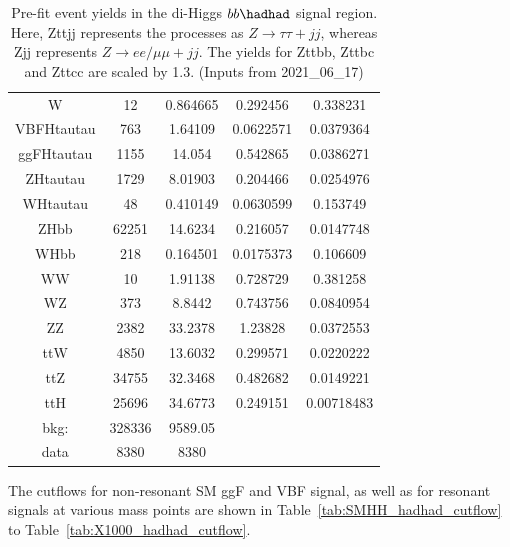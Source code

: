 \begin{table}[]
\begin{tabular}{|c|c|c|c|c|}
W               & 12            & 0.864665      & 0.292456      & 0.338231 \\
VBFHtautau      & 763           & 1.64109       & 0.0622571     & 0.0379364 \\
ggFHtautau      & 1155          & 14.054        & 0.542865      & 0.0386271 \\
ZHtautau        & 1729          & 8.01903       & 0.204466      & 0.0254976 \\
WHtautau        & 48            & 0.410149      & 0.0630599     & 0.153749 \\
ZHbb            & 62251         & 14.6234       & 0.216057      & 0.0147748 \\
WHbb            & 218           & 0.164501      & 0.0175373     & 0.106609 \\
WW              & 10            & 1.91138       & 0.728729      & 0.381258 \\
WZ              & 373           & 8.8442        & 0.743756      & 0.0840954 \\
ZZ              & 2382          & 33.2378       & 1.23828       & 0.0372553 \\
ttW             & 4850          & 13.6032       & 0.299571      & 0.0220222 \\
ttZ             & 34755         & 32.3468       & 0.482682      & 0.0149221 \\
ttH             & 25696         & 34.6773       & 0.249151      & 0.00718483 \\
\hline
bkg:            & 328336        & 9589.05  &&\\
data            & 8380          & 8380 && \\
\hline
\end{tabular}
\caption{Pre-fit event yields in the di-Higgs $bb\hadhad$ signal
  region. Here, Zttjj represents the processes as $Z\rightarrow\tau\tau + jj$,
whereas Zjj represents  $Z\rightarrow ee/\mu\mu + jj$. The yields for Zttbb, Zttbc and Zttcc are scaled by 1.3. (Inputs from 2021\_06\_17)}
\label{tab:HadHadYields}
\end{table}

The cutflows for non-resonant \hadhad SM ggF and VBF signal, as well as for resonant signals at various mass points are shown in Table~\ref{tab:SMHH_hadhad_cutflow} to Table~\ref{tab:X1000_hadhad_cutflow}.



\FloatBarrier
